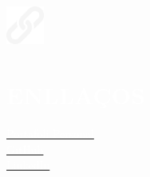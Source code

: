 \documentclass[../main.tex]{subfiles}
\begin{document}
    \hspace*{0.2cm}
    \begin{minipage}[t]{2.1cm}
        \vspace*{0.9cm}\includegraphics[width=1.25cm]{assets/link.png}
    \end{minipage}
    \begin{minipage}[t]{4.9cm}

        \vspace*{0.5cm}
        \section*{\textcolor{white}{ENLLAÇOS}}
        \vspace*{-0.25cm}
        \textcolor{white}{
            \vspace*{0.1cm}\underline{\href{https://albatalaya.github.io/}{\textcolor{white}{Portafoli Personal}}}\\
            \vspace*{0.1cm}\underline{\href{https://www.github.com/albatalaya}{\textcolor{white}{GitHub}}}\\
            \underline{\href{https://www.linkedin.com/in/albatalaya}{\textcolor{white}{LinkedIn}}}
        }
    \end{minipage}
\end{document}
